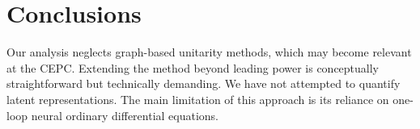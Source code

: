 \section{Conclusions}\label{sec:conclusions}

Our analysis neglects graph-based unitarity methods, which may become
relevant at the CEPC. Extending the method beyond leading power is
conceptually straightforward but technically demanding. We have not
attempted to quantify latent representations. The main limitation of
this approach is its reliance on one-loop neural ordinary differential
equations.

